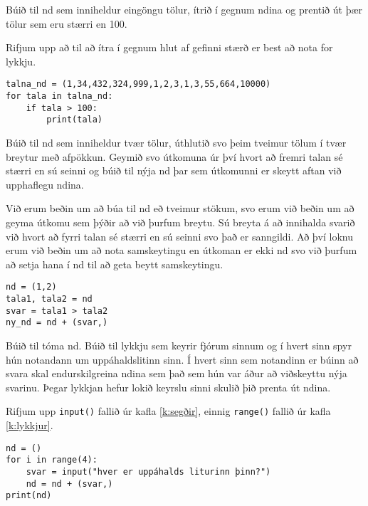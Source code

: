 \begin{exercise}\label{nd2}
Búið til nd sem inniheldur eingöngu tölur, ítrið í gegnum ndina og prentið út þær tölur sem eru stærri en 100.
\end{exercise}
\begin{Answer}[ref={nd2}]
Rifjum upp að til að ítra í gegnum hlut af gefinni stærð er best að nota for lykkju.
\begin{lstlisting}
talna_nd = (1,34,432,324,999,1,2,3,1,3,55,664,10000)
for tala in talna_nd:
	if tala > 100:
		print(tala)\end{lstlisting}
\end{Answer}

\begin{exercise}\label{nd3}
Búið til nd sem inniheldur tvær tölur, úthlutið svo þeim tveimur tölum í tvær breytur með afpökkun.
Geymið svo útkomuna úr því hvort að fremri talan sé stærri en sú seinni og búið til nýja nd þar sem útkomunni er skeytt aftan við upphaflegu ndina.
\end{exercise}
\begin{Answer}[ref={nd3}]
Við erum beðin um að búa til nd eð tveimur stökum, svo erum við beðin um að geyma útkomu sem þýðir að við þurfum breytu.
Sú breyta á að innihalda svarið við hvort að fyrri talan sé stærri en sú seinni svo það er sanngildi.
Að því loknu erum við beðin um að nota samskeytingu en útkoman er ekki nd svo við þurfum að setja hana í nd til að geta beytt samskeytingu.
	\begin{lstlisting}
nd = (1,2)
tala1, tala2 = nd
svar = tala1 > tala2
ny_nd = nd + (svar,)\end{lstlisting}
\end{Answer}

\begin{exercise}\label{nd4}
Búið til tóma nd.
Búið til lykkju sem keyrir fjórum sinnum og í hvert sinn spyr hún notandann um uppáhaldslitinn sinn.
Í hvert sinn sem notandinn er búinn að svara skal endurskilgreina ndina sem það sem hún var áður að viðskeyttu nýja svarinu.
Þegar lykkjan hefur lokið keyrslu sinni skulið þið prenta út ndina.
\end{exercise}
\begin{Answer}[ref={nd4}]
Rifjum upp  \texttt{input()} fallið úr kafla \ref{k:segðir}, einnig \texttt{range()} fallið úr kafla \ref{k:lykkjur}.
\begin{lstlisting}
nd = ()
for i in range(4):
	svar = input("hver er uppáhalds liturinn þinn?")
	nd = nd + (svar,)
print(nd)\end{lstlisting}
\end{Answer}